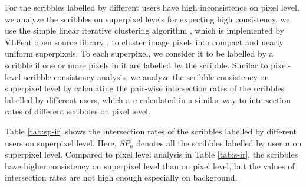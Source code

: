 \documentclass[runningheads,a4paper]{llncs}
\begin{document}
For the scribbles labelled by different users have high inconsistence on pixel level, we analyze the scribbles on superpixel levels for expecting high consistency. we use the simple linear iterative clustering algorithm \cite{achanta2010slic}, which is implemented by VLFeat open source library \cite{vedaldi08vlfeat}, to cluster image pixels into compact and nearly uniform superpixels. To each superpixel, we consider it to be labelled by a scribble if one or more pixels in it are labelled by the scribble. Similar to pixel-level scribble consistency analysis, we analyze the scribble consistency on superpixel level by calculating the pair-wise intersection rates of the scribbles labelled by different users, which are calculated in a similar way to intersection rates of different scribbles on pixel level.


Table \ref{tab:sp-ir} shows the intersection rates of the scribbles labelled by different users on superpixel level. Here, $SP_{n}$ denotes all the scribbles labelled by user $n$ on superpixel level. Compared to pixel level analysis in Table \ref{tab:s-ir}, the scribbles have higher consistency on superpixel level than on pixel level, but the values of intersection rates are not high enough especially on background.
\end{document}
